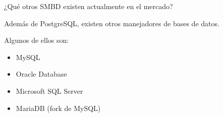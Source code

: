 \item ¿Qué otros SMBD existen actualmente en el mercado?

Además de PostgreSQL, existen otros manejadores de bases de datos.

Algunos de ellos son:

\begin{itemize}
    \item MySQL
    \item Oracle Database
    \item Microsoft SQL Server
    \item MariaDB (fork de MySQL)
\end{itemize}